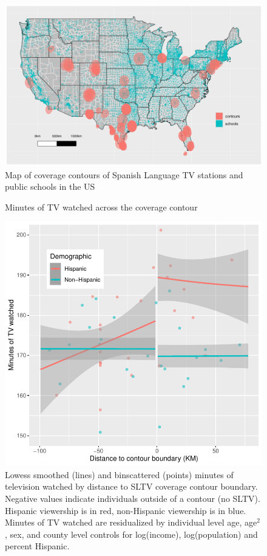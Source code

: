 \documentclass[11pt]{article}
\begin{document}
\begin{figure}[!hbtp]
\centering
\caption{Map of coverage contours of Spanish Language TV stations and public schools in the US}\label{f:contours_schools}
\includegraphics[width=14.4cm]{../../analysis/Output/img/Schools_pretty2.pdf}
\end{figure} 

\begin{figure}[!hbtp]
\centering
\caption{Minutes of TV watched across the coverage contour}\label{f:atus}
\includegraphics[width=14.5cm]{../../analysis/Output/graphs/atus2.pdf}
\caption*{Lowess smoothed (lines) and binscattered (points) minutes of television watched by distance to SLTV coverage contour boundary. Negative values indicate individuals outside of a contour (no SLTV). Hispanic viewership is in red, non-Hispanic viewership is in blue. Minutes of TV watched are residualized by individual level age, age$^2$, sex, and county level controls for log(income), log(population) and percent Hispanic. }
\end{figure} 
\end{document}
